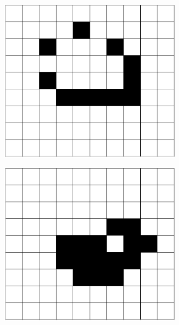 \documentclass[12pt]{article}
\numberwithin{figure}{section} %
\begin{document}
\begin{figure}[H]
\begin{subfigure}{0.18\textwidth}
     \centering
     \includegraphics[width=\linewidth]{Section1/6.2}
     \subcaption{}
   \end{subfigure}
     \begin{subfigure}{0.18\textwidth}
     \centering
     \includegraphics[width=\linewidth]{Section1/6.3}
     \subcaption{}
   \end{subfigure}
   \begin{subfigure}{0.18\textwidth}

\end{subfigure}
\end{figure}
\end{document}
